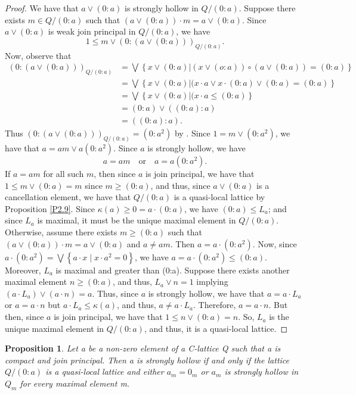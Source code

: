 \documentclass[11pt,english]{amsart}
\newtheorem{proposition}[theorem]{Proposition}
\theoremstyle{definition}
\numberwithin{equation}{section}
\theoremstyle{remark}
\def\leq{\leqslant}
\begin{document}
	\begin{proof}
		We have that $a\vee (0:a)$ is strongly hollow in $Q/(0:a)$. Suppose there exists $m\in Q/(0:a)$ such that $(a\vee (0:a))\cdot m=a\vee (0:a)$. Since $a\vee (0:a)$ is weak join principal in $Q/(0:a)$, we have \[1\leq m\vee(0:(a\vee (0:a)))_{Q/(0:a)}.\] Now, observe that 
		\begin{align*}
			(0:(a\vee (0:a)))_{Q/(0:a)}&=\bigvee\left\{x\vee (0:a) \left | (x\vee (o:a))\circ(a\vee (0:a))=(0:a)\right. \right\} \\
			&=\bigvee\left\{x\vee (0:a) \left |(x\cdot a\vee x\cdot (0:a)\vee (0:a)=(0:a)\right. \right\} \\
			&=\bigvee\left\{x\vee (0:a) \left |(x\cdot a\leq (0:a)\right. \right\} \\
			&= (0:a)\vee((0:a):a)\\
			&= ((0:a):a).
		\end{align*}
		Thus $(0:(a\vee (0:a)))_{Q/(0:a)}=(0:a^2)$ by \cite[Eqn.~2.5]{Dil62}. Since \(1=m\vee(0:a^2)\), we have that \(a=am\vee a(0:a^2)\). Since $a$ is strongly hollow, we have \[a=am\quad\text{or}\quad a=a(0:a^2).\] If $a=am$ for all such $m$, then since $a$ is join principal, we have that $1\leqslant m \vee (0:a)=m$ since $m\geqslant (0:a)$, and thus, since $a\vee (0:a)$ is a cancellation element, we have that $Q/(0:a)$ is a quasi-local lattice by Proposition \ref{P2.9}. Since $\kappa(a)\geqslant 0=a\cdot (0:a)$, we have $(0:a)\leq L_a$; and since $L_a$ is maximal, it must be the unique maximal element in $Q/(0:a)$. Otherwise, assume there exists $m\geqslant (0:a)$ such that $(a\vee (0:a))\cdot m=a\vee (0:a)$ and $a\neq am$. Then $a=a\cdot(0:a^2)$. Now, since $a\cdot(0:a^2)=\bigvee\left\{a\cdot x\mid x\cdot a^2=0 \right\}$, we have $a=a\cdot(0:a^2)\leq (0:a)$. Moreover, $L_a$ is maximal and greater than (0:a). Suppose there exists another maximal element $n\geqslant (0:a)$, and thus, $L_a\vee n=1$ implying $(a\cdot L_a)\vee(a\cdot n)=a$. Thus, since $a$ is strongly hollow, we have that $a=a\cdot L_a$ or $a=a\cdot n$ but $a\cdot L_a\leq \kappa(a)$, and thus, $a\neq a\cdot L_a$. Therefore, $a=a\cdot n$. But then, since $a$ is join principal, we have that $1\leq n\vee (0:a)=n$. So, $L_a$ is the unique maximal element in $Q/(0:a)$, and thus, it is a quasi-local lattice.
	\end{proof}
	
	\begin{proposition}\label{T2.15}
		Let a be a non-zero element of a C-lattice Q such that a is compact and join principal. Then a is strongly hollow if and only if the lattice $Q/(0:a)$ is a quasi-local lattice and either $a_m=0_m$ or $a_m$ is strongly hollow in $Q_m$ for every maximal element m.
	\end{proposition}
	
\end{document}
